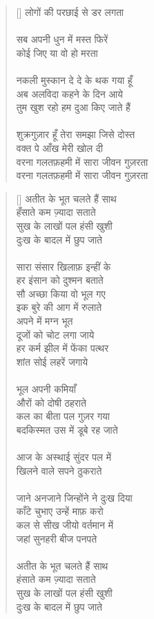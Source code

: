 \begin{verse}[\versewidth]
{लोगों की परछाई से डर लगता\\
\\
सब अपनी धुन में मस्त फिरें\\
कोई जिए या वो हो मरता\\
\\
नकली मुस्कान दे दे के थक गया हूँ\\
अब अलविदा कहने के दिन आये\\
तुम खुश रहो हम दुआ किए जाते हैं\\
\\
शुक्रगुज़ार हूँ तेरा समझा जिसे दोस्त\\
वक्त पे आँख मेरी खोल दी\\
वरना गलतफ़हमी में सारा जीवन गुज़रता\\
वरना गलतफ़हमी में सारा जीवन गुज़रता
}\end{verse}

\begin{verse}[\versewidth]\texthindi{
अतीत के भूत चलते हैं साथ\\
हँसाते कम ज़्यादा सताते\\
सुख के लाखों पल हंसी खुशी\\
दुःख के बादल में छुप जाते\\
\\
सारा संसार खिलाफ़ इन्हीं के\\
हर इंसान को दुश्मन बताते\\
सौ अच्छा किया वो भूल गए\\
इक बुरे की आग में रुलाते\\
अपने में मग्न भूत\\
दूजों को चोट लगा जाये\\
हर कर्म झील में फेंका पत्थर\\
शांत सोई लहरें जगाये\\
\\
भूल अपनी कमियाँ\\
औरों को दोषी ठहराते\\
कल का बीता पल गुज़र गया\\
बदकिस्मत उस में डूबे रह जाते\\
\\
आज के अस्थाई सुंदर पल में\\
खिलने वाले सपने ठुकराते\\
\\
जाने अनजाने जिन्होंने ने दुःख दिया\\
काँटे चुभाए उन्हें माफ़ करो\\
कल से सीख जीयो वर्तमान में\\
जहां सुनहरी बीज पनपते\\
\\
अतीत के भूत चलते हैं साथ\\
हंसाते कम ज़्यादा सताते\\
सुख के लाखों पल हंसी खुशी\\
दुःख के बादल में छुप जाते
}\end{verse}

